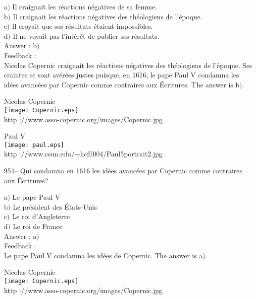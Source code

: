 ﻿\documentclass[letterpaper, 12pt]{article}
\begin{document}
a$)$ Il craignait les r\'eactions n\'egatives de sa femme. \\
b$)$ Il craignait les r\'eactions n\'egatives des th\'eologiens de
l'\'epoque. \\
c$)$ Il croyait que ses r\'esultats \'etaient impossibles.  \\
d$)$ Il ne voyait pas l'int\'er\^et de publier ses r\'esultats. \\

Answer : b$)$\\

Feedback : \\
Nicolas Copernic craignait les r\'eactions n\'egatives des
th\'eologiens de l'\'epoque. Ses craintes se sont av\'er\'ees justes
puisque, en 1616, le pape Paul V condamna les id\'ees avanc\'ees par
Copernic comme \og contraires aux \'Ecritures\fg . The answer is b$)$.\\

        \begin{center}
        Nicolas Copernic\\
    \texttt{[image: Copernic.eps]}\\
        {\footnotesize http ://www.asso-copernic.org/images/Copernic.jpg}
    \end{center}

        \begin{center}
        Paul V\\
    \texttt{[image: paul.eps]}\\
        {\footnotesize http
://www.csun.edu/$\sim$hcfll004/Paul5portrait2.jpg}
    \end{center}

954-- Qui condamna en 1616 les id\'ees avanc\'ees par Copernic comme
\og contraires aux \'Ecritures\fg ?

a$)$ Le pape Paul V \\
b$)$ Le pr\'esident des \'Etats-Unis \\
c$)$ Le roi d'Angleterre  \\
d$)$ Le roi de France\\

Answer : a$)$\\

Feedback : \\
Le pape Paul V condamna les id\'ees de Copernic. The answer is a$)$.\\

        \begin{center}
        Nicolas Copernic\\
    \texttt{[image: Copernic.eps]}\\
        {\footnotesize http ://www.asso-copernic.org/images/Copernic.jpg}
    \end{center}
\end{document}
